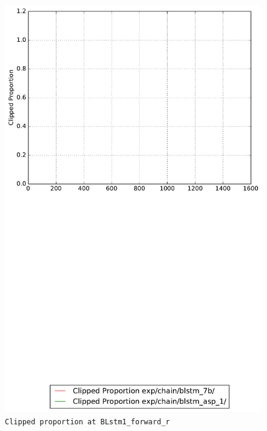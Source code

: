 \documentclass[prl,10pt,twocolumn]{revtex4}
\begin{document}
\newpage
\begin{figure}[h]
  \begin{center}
    \caption{\texttt{Clipped proportion at BLstm1\_forward\_r}}
    \includegraphics[width=\textwidth]{exp/chain/blstm_7b/report/clipped_proportion_BLstm1_forward_r.pdf}
  \end{center}
\end{figure}
\clearpage
\end{document}
